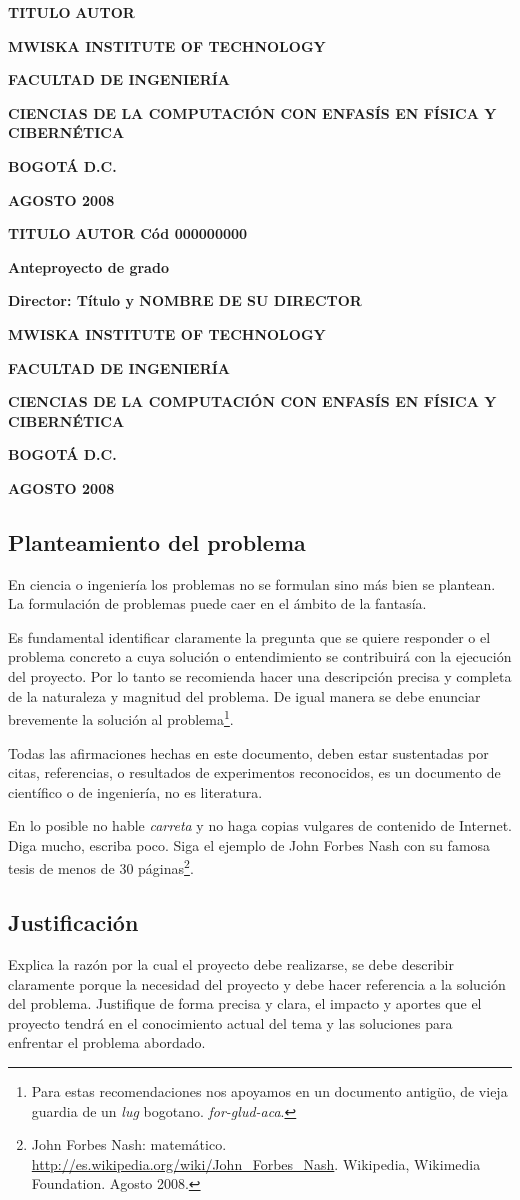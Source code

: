 \documentclass[a4paper, 11pt, oneside]{article}
\theoremstyle{definition}
\theoremstyle{remark}
\newcommand\portada{
\begin{titlepage}
		\begin{center}
			{\large \bf TITULO }
			\vfill
			{\large\bf AUTOR}
			\vfill
			{\large\bf MWISKA INSTITUTE OF TECHNOLOGY  \par}
			{\large\bf FACULTAD DE INGENIERÍA \par}
			{\large\bf CIENCIAS DE LA COMPUTACIÓN CON ENFASÍS EN FÍSICA Y CIBERNÉTICA \par}
			{\large\bf BOGOTÁ D.C.\par}
			{\large\bf AGOSTO 2008 \par}
		\end{center}
\end{titlepage}
}
\newcommand\contraportada{
	\begin{titlepage}
		\begin{center}
			{\large \bf TITULO } 
			\vfill
			{\large\bf AUTOR Cód 000000000}
			\vfill
			{\large\bf Anteproyecto de grado \par}
			\vfill
			{\large\bf Director: Título y NOMBRE DE SU DIRECTOR
\par}
			\vfill
			{\large\bf MWISKA INSTITUTE OF TECHNOLOGY \par}
			{\large\bf FACULTAD DE INGENIERÍA \par}
			{\large\bf CIENCIAS DE LA COMPUTACIÓN CON ENFASÍS EN FÍSICA Y CIBERNÉTICA \par}
			{\large\bf BOGOTÁ D.C.\par}
			{\large\bf AGOSTO 2008 \par}
		\end{center}
\end{titlepage}
}
\begin{document}
\portada
\contraportada





\renewcommand\contentsname{\centering Tabla de Contenidos}
\tableofcontents
\clearpage

\begin{center}
 \section{Planteamiento del problema}
\end{center}

En ciencia o ingeniería los problemas no se formulan sino más bien se plantean. La formulación de
problemas puede caer en el ámbito de la fantasía.

Es fundamental identificar claramente la pregunta que se quiere responder o el problema
concreto a cuya solución o entendimiento se contribuirá con la ejecución del proyecto. Por lo tanto
se recomienda hacer una descripción precisa y completa de la naturaleza y magnitud del problema. De
igual manera se debe enunciar brevemente la solución al problema\footnote{Para estas
recomendaciones nos apoyamos en un documento antigüo, de vieja guardia de un \textit{lug} bogotano.
\textit{for-glud-aca}.}.

Todas las afirmaciones hechas en este documento, deben estar sustentadas por citas, referencias, o
resultados de experimentos reconocidos, es un documento de científico o de ingeniería, no es
literatura.

En lo posible no hable \textit{carreta} y no haga copias vulgares de contenido de Internet. Diga
mucho, escriba poco. Siga el ejemplo de John Forbes Nash con su famosa tesis de menos de 30
páginas\footnote{John Forbes Nash: matemático. \url{http://es.wikipedia.org/wiki/John_Forbes_Nash}.
Wikipedia, Wikimedia Foundation. Agosto 2008.}.
\clearpage


\begin{center}
 \section{Justificación}
\end{center}
Explica la razón por la cual el proyecto debe realizarse, se debe describir claramente porque la
necesidad del proyecto y debe hacer referencia a la solución del problema. Justifique de forma
precisa y clara, el impacto y aportes que el proyecto tendrá en el conocimiento actual del tema y
las soluciones para enfrentar el problema abordado.
\clearpage
\end{document}
